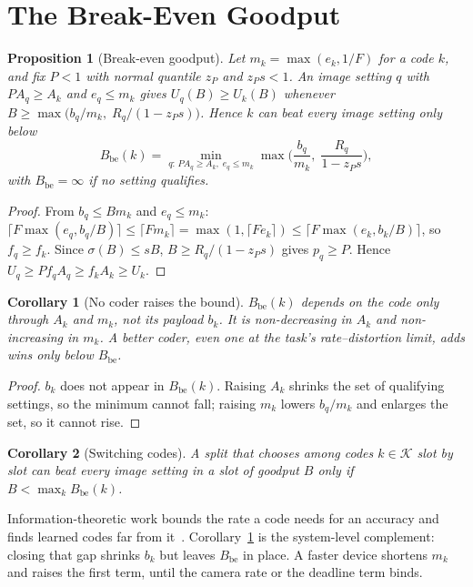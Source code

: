 \documentclass[conference,10pt]{IEEEtran}
\newtheorem{proposition}{Proposition}
\newtheorem{corollary}{Corollary}
\begin{document}
\section{The Break-Even Goodput}\label{sec:rule}
\begin{proposition}[Break-even goodput]\label{prop:be}
Let $m_k = \max(e_k, 1/F)$ for a code $k$, and fix $P<1$ with normal quantile $z_P$ and $z_P s < 1$. An image
setting $q$ with $P A_q \ge A_k$ and $e_q \le m_k$ gives $U_q(B) \ge U_k(B)$ whenever
$B \ge \max\big(b_q/m_k,\; R_q/(1 - z_P s)\big)$. Hence $k$ can beat every image setting only below
\begin{equation*}
B_{\mathrm{be}}(k) = \min_{q:\,P A_q \ge A_k,\; e_q \le m_k} \max\Big(\frac{b_q}{m_k},\; \frac{R_q}{1 - z_P s}\Big),
\end{equation*}
with $B_{\mathrm{be}} = \infty$ if no setting qualifies.
\end{proposition}
\begin{proof}
From $b_q \le B m_k$ and $e_q \le m_k$:
$\lceil F\max(e_q, b_q/B)\rceil \le \lceil F m_k\rceil = \max(1, \lceil F e_k\rceil) \le \lceil F\max(e_k, b_k/B)\rceil$,
so $f_q \ge f_k$. Since $\sigma(B) \le sB$, $B \ge R_q/(1 - z_P s)$ gives $p_q \ge P$. Hence
$U_q \ge P f_q A_q \ge f_k A_k \ge U_k$.
\end{proof}
\begin{corollary}[No coder raises the bound]\label{cor:coder}
$B_{\mathrm{be}}(k)$ depends on the code only through $A_k$ and $m_k$, not its payload $b_k$. It is non-decreasing in
$A_k$ and non-increasing in $m_k$. A better coder, even one at the task's rate--distortion limit, adds wins only below
$B_{\mathrm{be}}$.
\end{corollary}
\begin{proof}
$b_k$ does not appear in $B_{\mathrm{be}}(k)$. Raising $A_k$ shrinks the set of qualifying settings, so the minimum
cannot fall; raising $m_k$ lowers $b_q/m_k$ and enlarges the set, so it cannot rise.
\end{proof}
\begin{corollary}[Switching codes]\label{cor:switch}
A split that chooses among codes $k \in \mathcal K$ slot by slot can beat every image setting in a slot of goodput $B$
only if $B < \max_{k} B_{\mathrm{be}}(k)$.
\end{corollary}
\noindent Information-theoretic work bounds the rate a code needs for an accuracy and finds learned codes far from
it~\cite{shao2022taskoriented,tosc2026limits}. Corollary~\ref{cor:coder} is the system-level complement: closing that gap
shrinks $b_k$ but leaves $B_{\mathrm{be}}$ in place. A faster device shortens $m_k$ and raises the first term, until the
camera rate or the deadline term binds.
\end{document}
